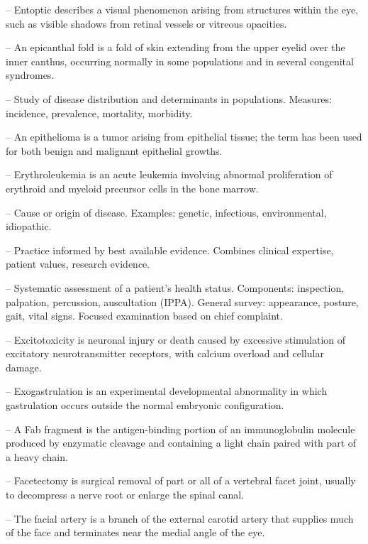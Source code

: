 -- Entoptic describes a visual phenomenon arising from structures within the eye, such as visible shadows from retinal vessels or vitreous opacities.

-- An epicanthal fold is a fold of skin extending from the upper eyelid over the inner canthus, occurring normally in some populations and in several congenital syndromes.

-- Study of disease distribution and determinants in populations. Measures: incidence, prevalence, mortality, morbidity.

-- An epithelioma is a tumor arising from epithelial tissue; the term has been used for both benign and malignant epithelial growths.

-- Erythroleukemia is an acute leukemia involving abnormal proliferation of erythroid and myeloid precursor cells in the bone marrow.

-- Cause or origin of disease. Examples: genetic, infectious, environmental, idiopathic.

-- Practice informed by best available evidence. Combines clinical expertise, patient values, research evidence.

-- Systematic assessment of a patient's health status. Components: inspection, palpation, percussion, auscultation (IPPA). General survey: appearance, posture, gait, vital signs. Focused examination based on chief complaint.

-- Excitotoxicity is neuronal injury or death caused by excessive stimulation of excitatory neurotransmitter receptors, with calcium overload and cellular damage.

-- Exogastrulation is an experimental developmental abnormality in which gastrulation occurs outside the normal embryonic configuration.

-- A Fab fragment is the antigen-binding portion of an immunoglobulin molecule produced by enzymatic cleavage and containing a light chain paired with part of a heavy chain.

-- Facetectomy is surgical removal of part or all of a vertebral facet joint, usually to decompress a nerve root or enlarge the spinal canal.

-- The facial artery is a branch of the external carotid artery that supplies much of the face and terminates near the medial angle of the eye.

